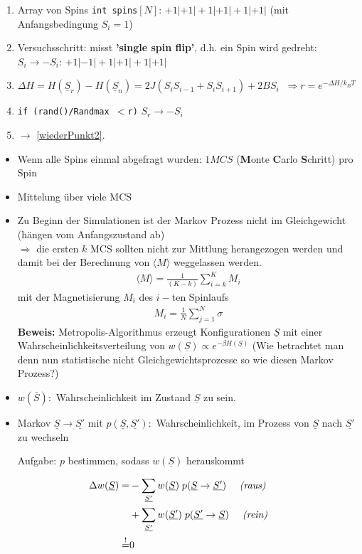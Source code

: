 \documentclass[12pt]{article}
\begin{document}
\begin{enumerate}
\item Array von Spins \texttt{int spins}$[N]$: $ +1|+1|+1|+1|+1|+1|$ (mit Anfangsbedingung $S_i =1$)
\item \label{wiederPunkt2} Versuchsschritt: misst \textbf{'single spin flip'}, d.h. ein Spin wird gedreht: \\
$S_i \rightarrow - S_i$: $ +1|-1|+1|+1|+1|+1|$
\item $\Delta H= H(\underline{S}_r)  - H(\underline{S}_n) = 2 J (S_i S_{i-1} + S_i S_{i+1}) + 2BS_i \; \; \Rightarrow r= e^{-\Delta H / k_BT}$
\item \texttt{if (rand()/Randmax $<$r)} $S_r \rightarrow -S_i$
\item $\rightarrow$ \ref{wiederPunkt2}.
\end{enumerate}

\begin{itemize}
\item Wenn alle Spins einmal abgefragt wurden: $1MCS$ (\textbf{M}onte \textbf{C}arlo \textbf{S}chritt) pro Spin
\item Mittelung über viele MCS

\item Zu Beginn der Simulationen ist der Markov Prozess nicht im Gleichgewicht (hängen vom Anfangszustand ab) \\
$\Rightarrow$  die ersten $k$ MCS sollten nicht zur Mittlung herangezogen werden und damit bei der Berechnung von $\langle M \rangle$ weggelassen werden.
 \begin{align}
\langle M \rangle = \frac{1}{(K-k)} \sum_{i=k}^K M_i 
\end{align}
mit der Magnetisierung $M_i$ des $i-$ten Spinlaufs
\begin{align*}
M_i = \frac{1}{N} \sum_{j=1}^N \sigma
\end{align*}
\textbf{Beweis:} Metropolis-Algorithmus erzeugt Konfigurationen $\underline{S}$ mit einer Wahrscheinlichkeitsverteilung von $w(\underline{S}) \propto e^{-\beta H(\underline{S})}$ (Wie betrachtet man denn nun statistische nicht Gleichgewichtsprozesse so wie diesen Markov Prozess?)
\item $w(\bar{S}):$ Wahrscheinlichkeit im Zustand $\underline{S}$ zu sein.
\item Markov $\underline{S} \rightarrow \underline{S'}$ mit $p(\underline{S}, \underline{S'}): $ Wahrscheinlichkeit, im Prozess von $\underline{S}$ nach $\underline{S'}$ zu wechseln

Aufgabe: $p$ bestimmen, sodass $w(\underline{S})$ herauskommt
\end{itemize} %
\begin{align*}
\Delta w(\underline{S}) =& 
- \sum_{\underline{S'}} w(\underline{S}) \; p(\underline{S} \rightarrow \underline{S'})\quad  \mbox{ \textit{(raus)} } \\
 &+  \sum_{\underline{S'}} w(\underline{S'}) \; p(\underline{S'} \rightarrow \underline{S}) \quad \mbox{\textit{ (rein)} } \\ 
 \overset{!}{=}& 0
\end{align*}
\end{document}
